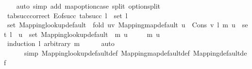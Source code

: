 \begin{isabellebody}
%
\isadelimproof
\ \ %
\endisadelimproof
%
\isatagproof
{}\isamarkupfalse%
\ {\isacharparenleft}{\kern0pt}auto\ simp\ add{\isacharcolon}{\kern0pt}\ map{\isacharunderscore}{\kern0pt}option{\isacharunderscore}{\kern0pt}case\ split{\isacharcolon}{\kern0pt}\ option{\isachardot}{\kern0pt}split{\isacharparenright}{\kern0pt}%
\endisatagproof
{\isafoldproof}%
%
\isadelimproof
\isanewline
%
\endisadelimproof
\isanewline
\isanewline
{}\isamarkupfalse%
\ tab{\isacharunderscore}{\kern0pt}succ{\isacharunderscore}{\kern0pt}correct{\isacharcolon}{\kern0pt}\ {\isachardoublequoteopen}E{\isacharunderscore}{\kern0pt}of{\isacharunderscore}{\kern0pt}succ\ {\isacharparenleft}{\kern0pt}tab{\isacharunderscore}{\kern0pt}succ\ l{\isacharparenright}{\kern0pt}\ {\isacharequal}{\kern0pt}\ set\ l{\isachardoublequoteclose}\isanewline
%
\isadelimproof
%
\endisadelimproof
%
\isatagproof
{}\isamarkupfalse%
\ {\isacharminus}{\kern0pt}\isanewline
\ \ \isamarkupfalse%
\ {\isachardoublequoteopen}set\ {\isacharparenleft}{\kern0pt}Mapping{\isachardot}{\kern0pt}lookup{\isacharunderscore}{\kern0pt}default\ {\isacharbrackleft}{\kern0pt}{\isacharbrackright}{\kern0pt}\ {\isacharparenleft}{\kern0pt}fold\ {\isacharparenleft}{\kern0pt}{\isasymlambda}{\isacharparenleft}{\kern0pt}u{\isacharcomma}{\kern0pt}v{\isacharparenright}{\kern0pt}{\isachardot}{\kern0pt}\ Mapping{\isachardot}{\kern0pt}map{\isacharunderscore}{\kern0pt}default\ u\ {\isacharbrackleft}{\kern0pt}{\isacharbrackright}{\kern0pt}\ {\isacharparenleft}{\kern0pt}Cons\ v{\isacharparenright}{\kern0pt}{\isacharparenright}{\kern0pt}\ l\ m{\isacharparenright}{\kern0pt}\ u{\isacharparenright}{\kern0pt}\ {\isacharequal}{\kern0pt}\ set\ l\ {\isacharbackquote}{\kern0pt}{\isacharbackquote}{\kern0pt}\ {\isacharbraceleft}{\kern0pt}u{\isacharbraceright}{\kern0pt}\ {\isasymunion}\ set\ {\isacharparenleft}{\kern0pt}Mapping{\isachardot}{\kern0pt}lookup{\isacharunderscore}{\kern0pt}default\ {\isacharbrackleft}{\kern0pt}{\isacharbrackright}{\kern0pt}\ m\ u{\isacharparenright}{\kern0pt}{\isachardoublequoteclose}\isanewline
\ \ \ \ \ m\ u\isanewline
\ \ \ \ \isamarkupfalse%
\ {\isacharparenleft}{\kern0pt}induction\ l\ arbitrary{\isacharcolon}{\kern0pt}\ m{\isacharparenright}{\kern0pt}\isanewline
\ \ \ \ \isamarkupfalse%
\ {\isacharparenleft}{\kern0pt}auto\isanewline
\ \ \ \ \ \ simp{\isacharcolon}{\kern0pt}\ Mapping{\isachardot}{\kern0pt}lookup{\isacharunderscore}{\kern0pt}default{\isacharunderscore}{\kern0pt}def\ Mapping{\isachardot}{\kern0pt}map{\isacharunderscore}{\kern0pt}default{\isacharunderscore}{\kern0pt}def\ Mapping{\isachardot}{\kern0pt}default{\isacharunderscore}{\kern0pt}def\isanewline

\end{isabellebody}

